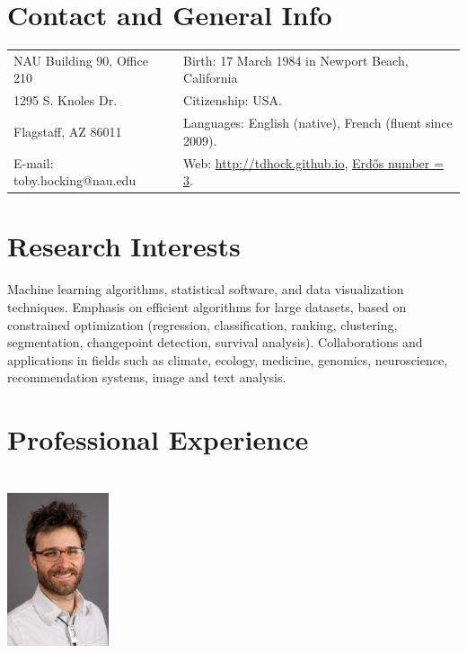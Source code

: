 \documentclass[margin,line]{res}
\begin{document}

\begin{resume}
\section{\sc Contact and General Info}
\vspace{.05in}
\begin{tabular*}{6.1in} {@{\extracolsep{\fill}}ll}
 NAU Building 90, Office 210 & Birth: 17 March 1984 in Newport Beach, California\\
 1295 S. Knoles Dr.  & Citizenship: USA. \\            
  Flagstaff, AZ 86011 & Languages: English (native), French
                        (fluent since 2009). \\
  E-mail:  toby.hocking@nau.edu & Web: \url{http://tdhock.github.io}, \href{https://tdhock.github.io/blog/2022/erdos-number/}{Erd\H{o}s number = 3}. \\
\end{tabular*}

\section{\sc Research Interests}

Machine learning algorithms, statistical software, and data
visualization techniques. Emphasis on efficient algorithms for large
datasets, based on constrained optimization (regression,
classification, ranking, clustering, segmentation, changepoint
detection, survival analysis). Collaborations and applications in
fields such as climate, ecology, medicine, genomics, neuroscience,
recommendation systems, image and text analysis.

\section{\sc Professional Experience \\ \hspace{0.1cm} \\ \includegraphics[width=3cm]{HOCKING-rectangle-lores.jpg}}


\end{resume}
\end{document}
